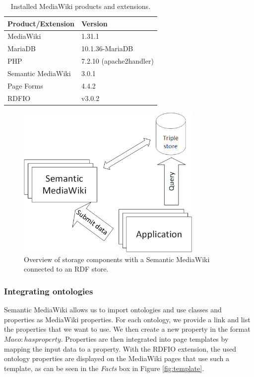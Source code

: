 \documentclass[10pt]{article}
\begin{document}
\renewcommand{\arraystretch}{2}%
\begin{table}
\centering
\begin{tabular}{|l|l|}
\hline
\textbf{Product/Extension} & \textbf{Version} \\ \hline
MediaWiki & 1.31.1 \\ \hline
MariaDB & 10.1.36-MariaDB \\ \hline
PHP & 7.2.10 (apache2handler) \\ \hline
Semantic MediaWiki & 3.0.1 \\ \hline
Page Forms & 4.4.2 \\ \hline
RDFIO & v3.0.2 \\ \hline
\end{tabular}
\caption{Installed MediaWiki products and extensions.}
  \label{tab:mwversion}
\end{table}
\begin{figure}
\centering
	\includegraphics[width=0.8\textwidth]{img/wiki.png}
	\caption{Overview of storage components with a Semantic MediaWiki connected to an RDF store.}
	\label{smwrdf}
\end{figure}	
\subsubsection{Integrating ontologies}
Semantic MediaWiki allows us to import ontologies and use classes and properties as MediaWiki properties. For each ontology, we provide a link and list the properties that we want to use. We then create a new property in the format $Maeo:has property$. Properties are then integrated into page templates by mapping the input data to a property. With the RDFIO extension, the used ontology properties are displayed on the MediaWiki pages that use such a template, as can be seen in the \textit{Facts} box in Figure \ref{fig:template}.
\end{document}
